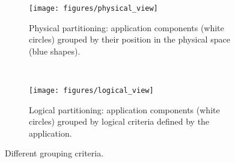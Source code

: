 
\begin{figure*}[t!]
    \centering
    \begin{subfigure}[b]{0.4\textwidth}
        \centering
        \texttt{[image: figures/physical\_view]}
        \caption{Physical partitioning: application components (white circles) grouped by their position in the physical space (blue shapes).}
    \end{subfigure}%
    ~ 
    \begin{subfigure}[b]{0.4\textwidth}
        \centering
        \texttt{[image: figures/logical\_view]}
        \caption{Logical partitioning: application components (white circles) grouped by logical criteria defined by the application.}
    \end{subfigure}
    \caption{Different grouping criteria.}
    \label{fig:motivation}
\end{figure*}











